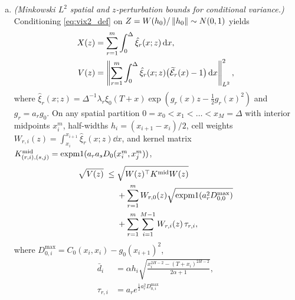 \begin{proposition}
\begin{enumerate}[(a)]
\begin{align*}
    &\qquad\quad x^{-\alpha}y^{-\alpha}\Big),\\
    0<\partial_{xx} C_0(x,y)&\le\min\!\Big(\frac{\alpha(\alpha+1)}{x^2}C_0(x,y),\\
    &\quad\frac{\alpha(\alpha+1)x^{2H-2}}{2\alpha+1},\,\alpha x^{-\alpha-1}y^{-\alpha}\Big).
  \end{align*}
  while $0<-\partial_y C_0(x,y)\le\alpha B(1-\alpha,2\alpha)\,y^{2H-1}$ and
  $0<\partial_{yy}C_0(x,y)\le\alpha(\alpha+1)B(1-\alpha,2\alpha+1)\,y^{2H-2}$, and $-\partial_x\ip{h_0}{\phi_x}\le\min(\frac{\alpha}{x}\ip{h_0}{\phi_x},
  \frac{\Delta^{H-1/2}}{H+1/2}x^{-\alpha})$. Applying a power-graded 2D midpoint mesh $x_i=\Delta(i/M)^p$
  on $[x_1,\Delta]^2$ plus an elementary monotone box on the corner strip $[0,x_1]\times[0,\Delta]\cup
  [x_1,\Delta]\times[0,x_1]$ yields an outward-rounded Arb enclosure of \eqref{eq:tilted_bracket}.
\item \emph{(Minkowski $L^2$ spatial and $z$-perturbation bounds for conditional variance.)} Conditioning
  \eqref{eq:vix2_def} on $Z=W(h_0)/\left\lVert h_0\right\rVert\sim N(0,1)$ yields
  \[
  \begin{aligned}
    X(z)&=\sum_{r=1}^m\int_0^\Delta\hat\xi_r(x;z)\,\mathrm{d} x,\\
    V(z)&=\left\lVert \sum_{r=1}^m\int_0^\Delta\hat\xi_r(x;z)\big(\widetilde{\mathcal{E}}_r(x)-1\big)\,\mathrm{d} x\right\rVert_{L^2}^2,
  \end{aligned}
  \]
  where $\hat\xi_r(x;z)=\Delta^{-1}\lambda_r\xi_0(T+x)\exp(g_r(x)z-\tfrac12 g_r(x)^2)$ and $g_r=a_r g_0$.
  On any spatial partition $0=x_0<x_1<\dots<x_M=\Delta$ with interior midpoints $x_i^m$, half-widths
  $h_i=(x_{i+1}-x_i)/2$, cell weights $W_{r,i}(z)=\int_{x_i}^{x_{i+1}}\hat\xi_r(x;z)\dd x$, and kernel matrix
  $K^{\mathrm{mid}}_{(r,i),(s,j)}=\operatorname{expm1}(a_r a_s D_0(x_i^m,x_j^m))$,
  \begin{equation}\label{eq:minkowski_x}
  \begin{split}
    \sqrt{V(z)}\;\le\;&\sqrt{W(z)^\top K^{\mathrm{mid}} W(z)}\\
    &+\sum_{r=1}^m W_{r,0}(z)\sqrt{\operatorname{expm1}(a_r^2 D_{0,0}^{\max})}\\
    &+\sum_{r=1}^m\sum_{i=1}^{M-1} W_{r,i}(z)\,\tau_{r,i},
  \end{split}
  \end{equation}
  where $D_{0,i}^{\max}=C_0(x_i,x_i)-g_0(x_{i+1})^2$,
  \begin{align*}
    \bar d_i&=\alpha h_i\sqrt{\frac{x_i^{2H-2}-(T+x_i)^{2H-2}}{2\alpha+1}},\\
    \tau_{r,i}&=a_r e^{\frac12 a_r^2 D_{0,i}^{\max}}\\

\end{align*}
\end{enumerate}
\end{proposition}
